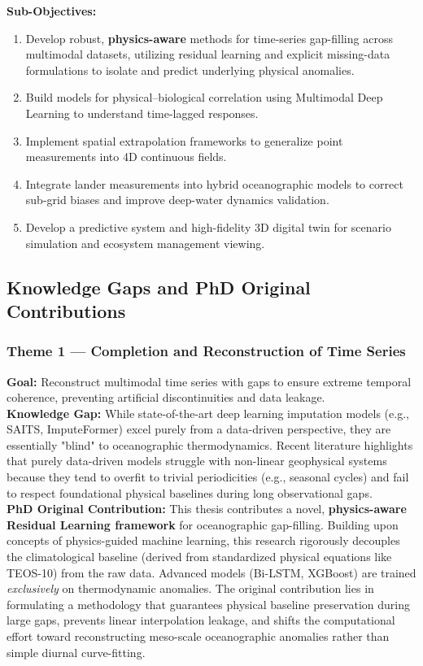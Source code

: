 \documentclass[12pt,a4paper]{article}
\begin{document}
\textbf{Sub-Objectives:}
\begin{enumerate}[noitemsep]
    \item Develop robust, \textbf{physics-aware} methods for time-series gap-filling across multimodal datasets, utilizing residual learning and explicit missing-data formulations to isolate and predict underlying physical anomalies.
    \item Build models for physical–biological correlation using Multimodal Deep Learning to understand time-lagged responses.
    \item Implement spatial extrapolation frameworks to generalize point measurements into 4D continuous fields.
    \item Integrate lander measurements into hybrid oceanographic models to correct sub-grid biases and improve deep-water dynamics validation.
    \item Develop a predictive system and high-fidelity 3D digital twin for scenario simulation and ecosystem management viewing.
\end{enumerate}

\subsection{Knowledge Gaps and PhD Original Contributions}

\subsubsection{Theme 1 — Completion and Reconstruction of Time Series}
\textbf{Goal:} Reconstruct multimodal time series with gaps to ensure extreme temporal coherence, preventing artificial discontinuities and data leakage. \\
\textbf{Knowledge Gap:} While state-of-the-art deep learning imputation models (e.g., SAITS, ImputeFormer) excel purely from a data-driven perspective, they are essentially "blind" to oceanographic thermodynamics. Recent literature highlights that purely data-driven models struggle with non-linear geophysical systems because they tend to overfit to trivial periodicities (e.g., seasonal cycles) and fail to respect foundational physical baselines during long observational gaps.\\
\textbf{PhD Original Contribution:} This thesis contributes a novel, \textbf{physics-aware Residual Learning framework} for oceanographic gap-filling. Building upon concepts of physics-guided machine learning, this research rigorously decouples the climatological baseline (derived from standardized physical equations like TEOS-10) from the raw data. Advanced models (Bi-LSTM, XGBoost) are trained \textit{exclusively} on thermodynamic anomalies. The original contribution lies in formulating a methodology that guarantees physical baseline preservation during large gaps, prevents linear interpolation leakage, and shifts the computational effort toward reconstructing meso-scale oceanographic anomalies rather than simple diurnal curve-fitting.
\end{document}

